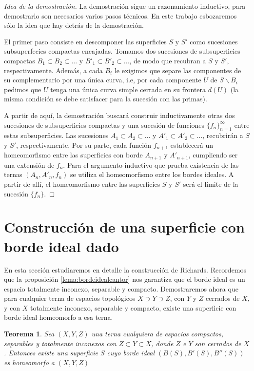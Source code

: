 \documentclass[a4paper,11pt,spanish, twoside, leqno]{tfg-uam}
\newtheorem{teor}{Teorema}[chapter]
\theoremstyle{definition}
\begin{document}
\begin{proof}[Idea de la demostración]
La demostración sigue un razonamiento inductivo, para demostrarlo son necesarios varios pasos técnicos. En este trabajo esbozaremos sólo la idea que hay detrás de la demostración.

El primer paso consiste en descomponer las superficies $S$ y $S'$ como sucesiones subsuperfecies compactas encajadas. Tomamos dos sucesiones de subsuperficies compactas $B_1 \subset B_2 \subset \ldots$ y $B'_1 \subset B'_2 \subset \ldots$, de modo que recubran a $S$ y $S'$, respectivamente. Además, a cada $B_i$ le exigimos  que separe las componentes de su complementario por una única curva, i.e, por cada componente $U$ de $S\backslash B_i$  pedimos que $U$  tenga una única curva simple cerrada en su frontera $d(U)$ (la misma condición se debe satisfacer para la sucesión con las primas).

A partir de aquí, la demostración buscará construir inductivamente otras dos sucesiones de subsuperficies compactas y una sucesión de funciones $\{f_n\}_{n=1}^{\infty}$ entre estas subsuperficies. Las sucesiones $A_1 \subset A_2 \subset \ldots$ y $A'_1 \subset A'_2 \subset \ldots$, recubrirán a $S$ y $S'$, respectivamente. Por su parte, cada función $f_{n+1}$ establecerá un homeomorfismo entre las superficies con borde   $A_{n+1}$ y $A'_{n+1}$, cumpliendo ser una extensión de $f_n$. Para el argumento inductivo que prueba existencia de las ternas $(A_n, A'_n, f_n)$ se utiliza el homeomorfismo entre los bordes ideales. A partir de allí, el homeomorfismo entre las superficies $S$ y $S'$ será el límite de la sucesión $\{f_n\}$.

\end{proof}


\section{Construcción de una superficie con borde ideal dado}
En esta sección estudiaremos en detalle la construcción de Richards. Recordemos que la proposición \ref{lema:bordeidealcantor} nos garantiza que el borde ideal es un espacio totalmente inconexo, separable y compacto. Demostraremos ahora que para cualquier terna de espacios topológicos $X \supset Y \supset Z$, con $Y$ y $Z$ cerrados de $X$, y con $X$ totalmente inconexo, separable y compacto, existe una superficie con borde ideal homeomorfo a esa terna.\\

\begin{teor}
\label{teor:richards}
Sea $(X,Y,Z)$ una terna cualquiera de espacios compactos, separables y totalmente inconexos con $Z \subset Y \subset X$, donde $Z$ e $Y$ son cerrados de $X$.  Entonces existe una superficie $S$ cuyo borde ideal $(B(S), B'(S), B''(S))$  es homeomorfo a $(X,Y,Z)$
\end{teor}
\end{document}
